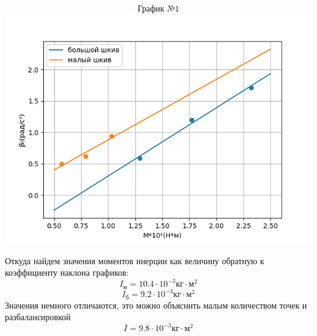 \documentclass[a4paper,12pt]{article} %
\begin{document}
\begin{center}
\[\text{График №1}\]
\includegraphics[scale=0.8]{graphoberi}
\end{center}
Откуда найдем значения моментов инерции как величину обратную к коэффициенту наклона графиков:
\[I_{\text{м}} = 10.4\cdot10^{-3}\text{кг}\cdot\text{м}^2\]
\[I_{\text{б}} = 9.2\cdot10^{-3}\text{кг}\cdot\text{м}^2\] 
Значения немного отличаются, это можно объяснить малым количеством точек и разбалансировкой
\[\overline{I} = 9.8\cdot10^{-3}\text{кг}\cdot\text{м}^2\]
\end{document}
